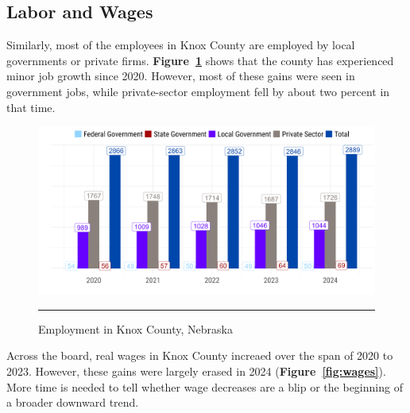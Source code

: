 \pagebreak
\subsection{Labor and Wages}

\noindent Similarly, most of the employees in Knox County are employed by local governments or private firms. \textbf{Figure~\ref{fig:employment}} shows that the county has experienced minor job growth since 2020. However, most of these gains were seen in government jobs, while private-sector employment fell by about two percent in that time.

\begin{figure}[H]
\centering
\begin{framed}
    \caption{Employment in Knox County, Nebraska}
    \label{fig:employment}
    \includegraphics[width=\linewidth]{figures/employment.png}
    \rule[-5pt]{\linewidth}{0.4pt}
\end{framed}
\end{figure}

\pagebreak

\noindent Across the board, real wages in Knox County increaed over the span of 2020 to 2023. However, these gains were largely erased in 2024 (\textbf{Figure~\ref{fig:wages}}). More time is needed to tell whether wage decreases are a blip or the beginning of a broader downward trend.


